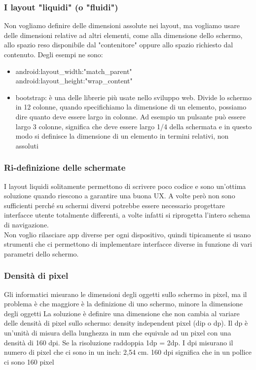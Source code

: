 \subsubsection{I layout "liquidi" (o "fluidi")}
Non vogliamo definire delle dimensioni assolute nei layout, ma vogliamo usare delle dimensioni relative ad altri elementi, come alla dimensione dello schermo, allo spazio reso disponibile dal "contenitore" oppure allo spazio richiesto dal contenuto.
Degli esempi ne sono:
\begin{itemize}
    \item android:layout\_width:"match\_parent" \\
          android:layout\_height:"wrap\_content"
    \item bootstrap: è una delle librerie più usate nello sviluppo web. Divide lo schermo in 12 colonne, quando specifichiamo la dimensione di un elemento, possiamo dire quanto deve essere largo in colonne. Ad esempio un pulsante può essere largo 3 colonne, significa che deve essere largo 1/4 della schermata e in questo modo si definisce la dimensione di un elemento in termini relativi, non assoluti
\end{itemize}

\subsubsection{Ri-definizione delle schermate}
I layout liquidi solitamente permettono di scrivere poco codice e sono un'ottima soluzione quando riescono a garantire una buona UX. 
A volte però non sono sufficienti perché su schermi diversi potrebbe essere necessario progettare interfacce utente totalmente differenti, a volte infatti si riprogetta l'intero schema di navigazione. 
\\ Non voglio rilasciare app diverse per ogni dispositivo, quindi tipicamente si usano strumenti che ci permettono di implementare interfacce diverse in funzione di vari parametri dello schermo. 

\subsubsection{Densità di pixel}
Gli informatici misurano le dimensioni degli oggetti sullo schermo 
in pixel, ma il problema è che maggiore è la definizione di uno schermo, minore la dimensione degli oggetti 
La soluzione è definire una dimensione che non cambia al variare delle densità di pixel sullo schermo: density independent pixel (dip o dp).
Il dp è un'unità di misura della lunghezza in mm che equivale ad un pixel con una densità di 160 dpi. Se la risoluzione raddoppia 1dp = 2dp. I dpi misurano il numero di pixel che ci sono in un inch: 2,54 cm. 160 dpi significa che in un pollice ci sono 160 pixel

